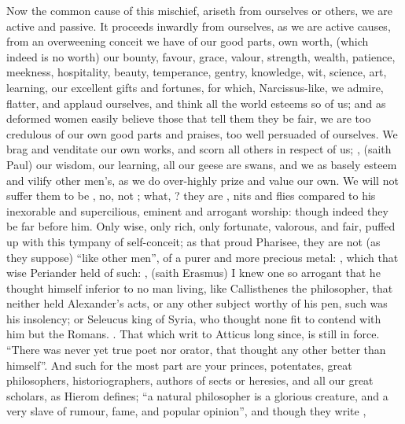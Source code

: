 Now the common cause of this mischief, ariseth from ourselves or others,
we are active and passive. It proceeds inwardly from
ourselves, as we are active causes, from an overweening conceit we have of our
good parts, own worth, (which indeed is no worth) our bounty, favour, grace,
valour, strength, wealth, patience, meekness, hospitality, beauty, temperance,
gentry, knowledge, wit, science, art, learning, our
excellent gifts and fortunes, for which, Narcissus-like,
we admire, flatter, and applaud ourselves, and think all the world esteems so
of us; and as deformed women easily believe those that tell them they be fair,
we are too credulous of our own good parts and praises, too well persuaded of
ourselves. We brag and venditate our own works, and scorn
all others in respect of us; , (saith Paul) our wisdom,
our learning, all our geese are swans, and we as basely
esteem and vilify other men's, as we do over-highly prize and value our own. We
will not suffer them to be , no, not ; what,
? they are ,
nits and flies compared to his inexorable and supercilious, eminent and
arrogant worship: though indeed they be far before him. Only wise, only rich,
only fortunate, valorous, and fair, puffed up with this tympany of
self-conceit; as that proud Pharisee, they are not (as
they suppose) \enquote{like other men}, of a purer and more precious metal:
, which that wise
Periander held of such: , \etc{}  (saith Erasmus) I knew
one so arrogant that he thought himself inferior to no man living, like
Callisthenes the philosopher, that neither held
Alexander's acts, or any other subject worthy of his pen, such was his
insolency; or Seleucus king of Syria, who thought none fit to contend with him
but the Romans. . That which \Tully{} writ to Atticus long since, is still in
force. \enquote{There was never yet true poet nor orator, that
thought any other better than himself}. And such for the most part are your
princes, potentates, great philosophers, historiographers, authors of sects or
heresies, and all our great scholars, as Hierom defines;
\enquote{a natural philosopher is a glorious creature, and a very slave of rumour,
fame, and popular opinion}, and though they write ,
